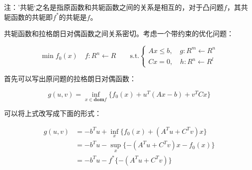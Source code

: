 \documentclass{article}
\begin{document}
    注：’共轭‘之名是指原函数和共轭函数之间的关系是相互的，对于凸问题$f$，其共轭函数的共轭即$f^*$的共轭是$f$。

    共轭函数和拉格朗日对偶函数之间关系密切。考虑一个带约束的优化问题：

    \begin{equation*}
        \min f_0(x) \quad f: R^n \leftarrow R \quad \quad \text{s.t.} 
        \begin{cases}
            Ax \le b, \quad  g: R^m \leftarrow R^n\\
            Cx=0, \quad  h: R^n \leftarrow R^l
        \end{cases}
    \end{equation*}  

    首先可以写出原问题的拉格朗日对偶函数：

    \begin{equation*}
        g(u, v) = \inf_{x \in \mathbf{dom} f} \{ f_0(x) + u^T (Ax-b) + v^TCx\} 
    \end{equation*}

    可以将上式改写成下面的形式：

    \begin{align*}
        g(u,v) &= -b^Tu + \inf_x \{ f_0(x) + (A^Tu+C^Tv)x\} \\
        &= -b^Tu - \sup_x \{ - (A^Tu+C^Tv)x - f_0(x)\} \\
        &= -b^Tu - f^*\{ - (A^Tu+C^Tv)\} 
    \end{align*}

    
\end{document}
